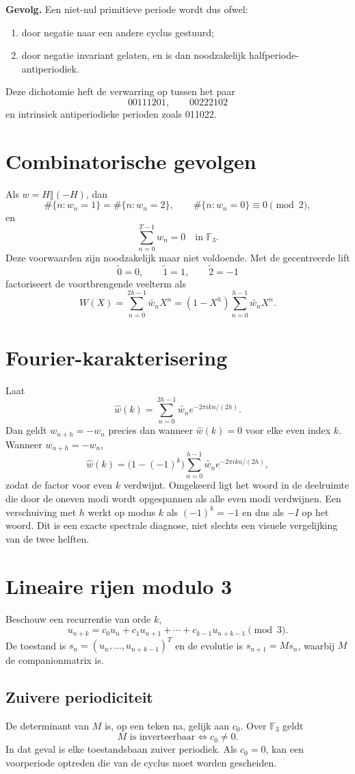 \documentclass[11pt,a4paper]{article}
\newcommand{\F}{\mathbb{F}}
\newcommand{\oplusword}{\mathbin{\Vert}}
\newcommand{\centerlift}[1]{\widetilde{#1}}
\begin{document}
\textbf{Gevolg.} Een niet-nul primitieve periode wordt dus ofwel:
\begin{enumerate}
\item door negatie naar een andere cyclus gestuurd;
\item door negatie invariant gelaten, en is dan noodzakelijk halfperiode-antiperiodiek.
\end{enumerate}
Deze dichotomie heft de verwarring op tussen het paar
\[
00111201,\qquad 00222102
\]
en intrinsiek antiperiodieke perioden zoals 011022.

\section{Combinatorische gevolgen}
Als $w=H\oplusword(-H)$, dan
\[
\#\{n:w_n=1\}=\#\{n:w_n=2\},\qquad \#\{n:w_n=0\}\equiv0\pmod2,
\]
en
\[
\sum_{n=0}^{T-1}w_n=0\quad\text{in }\F_3.
\]
Deze voorwaarden zijn noodzakelijk maar niet voldoende. Met de gecentreerde lift
\[
\centerlift0=0,\qquad \centerlift1=1,\qquad \centerlift2=-1
\]
factoriseert de voortbrengende veelterm als
\[
W(X)=\sum_{n=0}^{2h-1}\centerlift{w_n}X^n=(1-X^h)\sum_{n=0}^{h-1}\centerlift{w_n}X^n.
\]

\clearpage
\section{Fourier-karakterisering}
Laat
\[
\widehat w(k)=\sum_{n=0}^{2h-1}\centerlift{w_n}e^{-2\pi i kn/(2h)}.
\]
Dan geldt $w_{n+h}=-w_n$ precies dan wanneer $\widehat w(k)=0$ voor elke even index $k$. Wanneer $w_{n+h}=-w_n$,
\[
\widehat w(k)=\bigl(1-(-1)^k\bigr)\sum_{n=0}^{h-1}\centerlift{w_n}e^{-2\pi i kn/(2h)},
\]
zodat de factor voor even $k$ verdwijnt. Omgekeerd ligt het woord in de deelruimte die door de oneven modi wordt opgespannen als alle even modi verdwijnen. Een verschuiving met $h$ werkt op modus $k$ als $(-1)^k=-1$ en dus als $-I$ op het woord. Dit is een exacte spectrale diagnose, niet slechts een visuele vergelijking van de twee helften.

\section{Lineaire rijen modulo 3}
Beschouw een recurrentie van orde $k$,
\[
u_{n+k}=c_0u_n+c_1u_{n+1}+\cdots+c_{k-1}u_{n+k-1}\pmod3.
\]
De toestand is $s_n=(u_n,\ldots,u_{n+k-1})^T$ en de evolutie is $s_{n+1}=Ms_n$, waarbij $M$ de companionmatrix is.

\subsection{Zuivere periodiciteit}
De determinant van $M$ is, op een teken na, gelijk aan $c_0$. Over $\F_3$ geldt
\[
M\text{ is inverteerbaar}\iff c_0\neq0.
\]
In dat geval is elke toestandsbaan zuiver periodiek. Als $c_0=0$, kan een voorperiode optreden die van de cyclus moet worden gescheiden.
\end{document}
